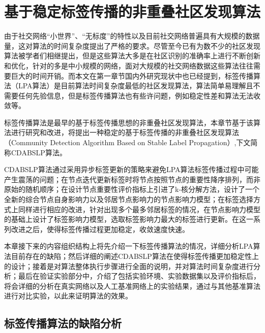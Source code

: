 \chapter{基于稳定标签传播的非重叠社区发现算法}

由于社交网络“小世界”、“无标度”的特性以及目前社交网络普遍具有大规模的数据量，这对算法的时间复杂度提出了严格的要求。尽管至今已有为数不少的社区发现算法被学者们相继提出，但是这些算法大多是在社区识别的准确率上进行不断创新和优化，针对的多是中小规模的网络，面对大规模的社交网络数据这些算法往往需要巨大的时间开销。而本文在第一章节国内外研究现状中也已经提到，标签传播算法（LPA算法）\cite{Raghavan2007Near}是目前算法时间复杂度最低的社区发现算法，算法简单易理解且不需要任何先验信息，但是标签传播算法也有些许问题，例如稳定性差和算法无法收敛等。

标签传播算法是最早的基于标签传播思想的非重叠社区发现算法，本章节基于该算法进行研究和改进，将提出一种稳定的基于标签传播的非重叠社区发现算法（Community Detection Algorithm Based on Stable Label Propagation）,下文简称CDABSLP算法。

CDABSLP算法通过采用异步标签更新的策略来避免LPA算法标签传播过程中可能产生震荡的问题；在节点迭代更新标签时将节点按照节点的重要性降序排列，而非原始的随机顺序；在设计节点重要性评价指标上引进了k-核分解方法，设计了一个全新的综合节点自身影响力以及邻居节点影响力的节点影响力模型；在标签选择方式上同样进行相应的改进，针对出现多个最多邻居标签的情况，在节点影响力模型的基础上设计了标签影响力模型，选取标签影响力最大的标签进行更新。在这一系列改进之后，使得标签传播过程更加稳定，收敛速度快速。

本章接下来的内容组织结构上将先介绍一下标签传播算法的情况，详细分析LPA算法目前存在的缺陷；然后详细的阐述CDABSLP算法在使得标签传播更加稳定性上的设计；接着是对算法整体执行步骤进行全面的说明，并对算法时间复杂度进行分析；最后在验证实验部分中，介绍了包括实验环境、实验数据集以及评价指标后，将会详细的分析在真实网络以及人工基准网络上的实验结果，通过与其他基准算法进行对比实验，以此来证明算法的效果。

\section{标签传播算法的缺陷分析}

